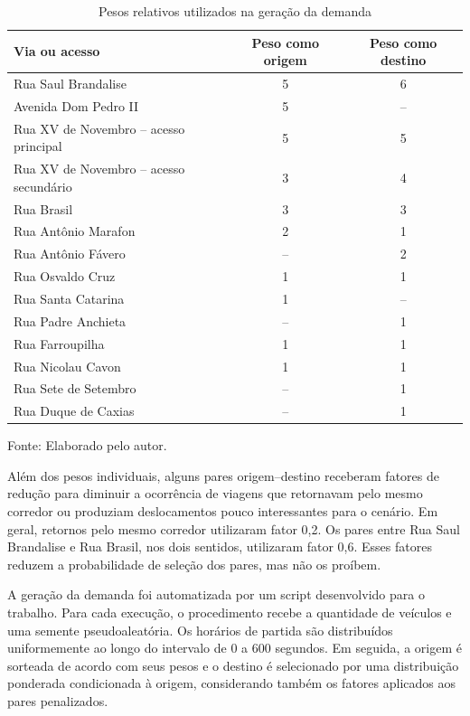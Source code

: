 \begin{table}[H]
\centering
\caption{Pesos relativos utilizados na geração da demanda}
\label{tab:pesos-demanda}
\small
\renewcommand{\arraystretch}{1.20}
\begin{tabular}{|p{6.2cm}|c|c|}
\hline
\textbf{Via ou acesso} & \textbf{Peso como origem} & \textbf{Peso como destino} \\
\hline
Rua Saul Brandalise & 5 & 6 \\
\hline
Avenida Dom Pedro II & 5 & -- \\
\hline
Rua XV de Novembro -- acesso principal & 5 & 5 \\
\hline
Rua XV de Novembro -- acesso secundário & 3 & 4 \\
\hline
Rua Brasil & 3 & 3 \\
\hline
Rua Antônio Marafon & 2 & 1 \\
\hline
Rua Antônio Fávero & -- & 2 \\
\hline
Rua Osvaldo Cruz & 1 & 1 \\
\hline
Rua Santa Catarina & 1 & -- \\
\hline
Rua Padre Anchieta & -- & 1 \\
\hline
Rua Farroupilha & 1 & 1 \\
\hline
Rua Nicolau Cavon & 1 & 1 \\
\hline
Rua Sete de Setembro & -- & 1 \\
\hline
Rua Duque de Caxias & -- & 1 \\
\hline
\end{tabular}

\par\vspace{0.25cm}
\begin{minipage}{\textwidth}
\footnotesize Fonte: Elaborado pelo autor.
\end{minipage}
\end{table}

Além dos pesos individuais, alguns pares origem--destino receberam fatores de redução para diminuir a ocorrência de viagens que retornavam pelo mesmo corredor ou produziam deslocamentos pouco interessantes para o cenário. Em geral, retornos pelo mesmo corredor utilizaram fator 0,2. Os pares entre Rua Saul Brandalise e Rua Brasil, nos dois sentidos, utilizaram fator 0,6. Esses fatores reduzem a probabilidade de seleção dos pares, mas não os proíbem.

A geração da demanda foi automatizada por um script desenvolvido para o trabalho. Para cada execução, o procedimento recebe a quantidade de veículos e uma semente pseudoaleatória. Os horários de partida são distribuídos uniformemente ao longo do intervalo de 0 a 600 segundos. Em seguida, a origem é sorteada de acordo com seus pesos e o destino é selecionado por uma distribuição ponderada condicionada à origem, considerando também os fatores aplicados aos pares penalizados.

